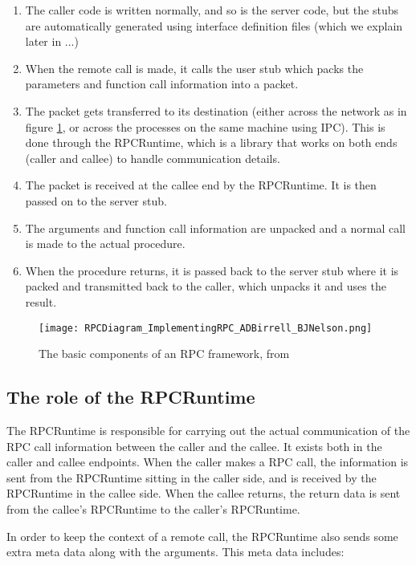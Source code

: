 \begin{enumerate}
  \item The caller code is written normally, and so is the server code, but the stubs are automatically generated using interface definition files (which we explain later in ...)
  \item When the remote call is made, it calls the user stub which packs the parameters and function call information into a packet.
  \item The packet gets transferred to its destination (either across the network as in figure \ref{fig:rpc-components}, or across the processes on the same machine using IPC). This is done through the RPCRuntime, which is a library that works on both ends (caller and callee) to handle communication details.
  \item The packet is received at the callee end by the RPCRuntime. It is then passed on to the server stub.
  \item The arguments and function call information are unpacked and a normal call is made to the actual procedure.
  \item When the procedure returns, it is passed back to the server stub where it is packed and transmitted back to the caller, which unpacks it and uses the result.
\end{enumerate}

\begin{figure}
    \centering
    \texttt{[image: RPCDiagram\_ImplementingRPC\_ADBirrell\_BJNelson.png]} %
    \caption{The basic components of an RPC framework, from \cite{birrell1984implementing}}
    \label{fig:rpc-components}
\end{figure}

\subsection{The role of the RPCRuntime}
\label{RPCRuntimeBackgroundSection} 
The RPCRuntime is responsible for carrying out the actual communication of the RPC call information between the caller and the callee. It exists both in the caller and callee endpoints. When the caller makes a RPC call, the information is sent from the RPCRuntime sitting in the caller side, and is received by the RPCRuntime in the callee side. When the callee returns, the return data is sent from the callee's RPCRuntime to the caller's RPCRuntime.

In order to keep the context of a remote call, the RPCRuntime also sends some extra meta data along with the arguments. This meta data includes: 

